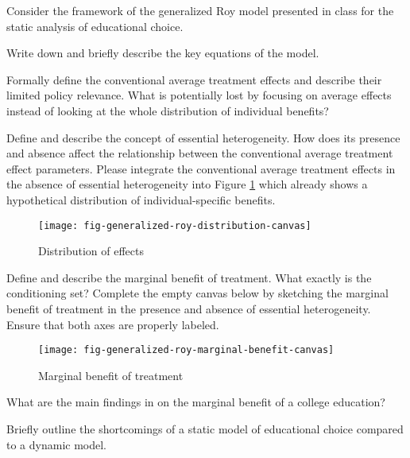 Consider the framework of the generalized Roy model presented in class for the static analysis of educational choice.

\begin{boenumerate}

\item Write down and briefly describe the key equations of the model.

\item Formally define the conventional average treatment effects and describe their limited policy relevance. What is potentially lost by focusing on average effects instead of looking at the whole distribution of individual benefits?

\item Define and describe the concept of essential heterogeneity. How does its presence and absence affect the relationship between the conventional average treatment effect parameters. Please integrate the conventional average treatment effects in the absence of essential heterogeneity into Figure \ref{Distribution of effects} which already shows a hypothetical distribution of individual-specific benefits.

\begin{figure}[htp]\centering
\caption{Distribution of effects}\label{Distribution of effects}\scalebox{0.35}
{\texttt{[image: fig-generalized-roy-distribution-canvas]}}
\end{figure}

\item Define and describe the marginal benefit of treatment. What exactly is the conditioning set? Complete the empty canvas below by sketching the marginal benefit of treatment in the presence and absence of essential heterogeneity. Ensure that both axes are properly labeled.

\begin{figure}[htp]\centering
\caption{Marginal benefit of treatment}\scalebox{0.35}
{\texttt{[image: fig-generalized-roy-marginal-benefit-canvas]}}
\end{figure}

\item What are the main findings in \cite{Carneiro.2011} on the marginal benefit of a college education?

\item Briefly outline the shortcomings of a static model of educational choice compared to a dynamic model.
\end{boenumerate}
